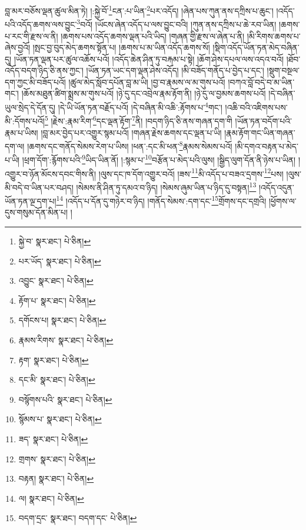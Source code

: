 བླ་མར་བཅོས་ལྡན་ཚུལ་མིན་ཏེ། །:སྐྱེ་བོ་\footnote{སྐྱེ་བ་  སྣར་ཐང་།  པེ་ཅིན། }ངན་:པ་ཡིན་\footnote{པར་ཡོད་  སྣར་ཐང་།  པེ་ཅིན། }པར་འདོད། །ཞེན་པས་ཀུན་ནས་དཀྲིས་པ་ཆུང་། །འདོད་པའི་འདོད་ཆགས་ལས་བྱུང་\footnote{འབྱུང་  སྣར་ཐང་།  པེ་ཅིན། }བའོ། །ཡོངས་ཞེན་འདོད་པ་ལས་བྱུང་བའི། །ཀུན་ནས་དཀྲིས་པ་ཆེ་རབ་ཡིན། །ཆགས་པ་རང་གི་རྫས་ལ་ནི། །ཆགས་པས་འདོད་ཆགས་ལྡན་པའི་ཡིད། །གཞན་གྱི་རྫས་ལ་ཞེན་པ་ནི། །མི་རིགས་ཆགས་པ་ཞེས་བྱའོ། །སྤང་བྱ་བུད་མེད་ཆགས་སྟོན་པ། །ཆགས་པ་མ་ཡིན་འདོད་ཆགས་སོ། །སྡིག་འདོད་ཡོན་ཏན་མེད་བཞིན་དུ། །ཡོན་ཏན་ལྡན་པར་ཚུལ་འཆོས་པའོ། །འདོད་ཆེན་ཤིན་ཏུ་བརྐམ་པ་སྟེ། །ཆོག་ཤེས་དཔལ་ལས་འདའ་བའོ། །ཐོབ་འདོད་བདག་ཉིད་ཅི་ནས་ཀྱང་། །ཡོན་ཏན་ཡང་དག་ལྡན་ཤེས་འདོད། །མི་བཟོད་གནོད་པ་བྱེད་པ་དང་། །སྡུག་བསྔལ་དག་ཀྱང་མི་བཟོད་པའོ། །ཚུལ་མེད་སློབ་དཔོན་བླ་མ་ཡི། །བྱ་བ་རྣམས་ལ་མ་གུས་པའོ། །བཀའ་བློ་བདེ་བ་མ་ཡིན་གང་། །ཆོས་མཐུན་ཚིག་སྨྲས་མ་གུས་པའོ། །ཉེ་དུ་དང་འབྲེལ་རྣམ་རྟོག་ནི། །ཉེ་དུ་ལ་བྱམས་ཆགས་པའོ། །དེ་བཞིན་ཡུལ་སྲེད་དེ་དོན་དུ། །དེ་ཡི་ཡོན་ཏན་བརྗོད་པའོ། །དེ་བཞིན་མི་འཆི་:རྟོགས་པ་\footnote{རྟོག་པ་  སྣར་ཐང་།  པེ་ཅིན། }གང་། །འཆི་བའི་འཇིགས་པས་མི་:དོགས་པའོ།\footnote{དགོངས་པ།  སྣར་ཐང་།  པེ་ཅིན། } །རྗེས་:རྣམ་རིག་\footnote{རྣམས་རིགས་  སྣར་ཐང་།  པེ་ཅིན། }དང་ལྡན་རྟོག་\footnote{རྟག་  སྣར་ཐང་།  པེ་ཅིན། }ནི། །བདག་ཉིད་ཅི་ནས་གཞན་དག་གི །ཡོན་ཏན་བདོག་པའི་རྣམ་པ་ཡིས། །བླ་མར་བྱེད་པར་འགྱུར་སྙམ་པའོ། །གཞན་རྗེས་ཆགས་དང་ལྡན་པ་ཡི། །རྣམ་རྟོག་གང་ཡིན་གཞན་དག་ལ། །ཆགས་དང་གནོད་སེམས་རེག་པ་ཡིས། །ཕན་:དང་མི་ཕན་\footnote{དང་མི་  སྣར་ཐང་།  པེ་ཅིན། }རྣམས་སེམས་པའོ། །མི་དགའ་བརྟན་པ་མེད་པ་ཡི། །ཕྲག་དོག་:རྙོགས་པའི་\footnote{བསྙོགས་པའི་  སྣར་ཐང་།  པེ་ཅིན། }ཡིད་ཡིན་ནོ། །:སྙམ་པ་\footnote{སྙོམས་པ་  སྣར་ཐང་།  པེ་ཅིན། }བརྩོན་པ་མེད་པའི་ལུས། །སྒྱིད་ལུག་དོན་ནི་ཉེས་པ་ཡིན། །འགྱུར་བ་ཉོན་མོངས་དབང་གིས་ནི། །ལུས་དང་ཁ་དོག་འགྱུར་བའོ། །ཟས་\footnote{ཟད་  སྣར་ཐང་།  པེ་ཅིན། }མི་འདོད་པ་བཟའ་དྲགས་\footnote{གྲགས་  སྣར་ཐང་།  པེ་ཅིན། }པས། །ལུས་མི་བདེ་བ་ཡིན་པར་བཤད། །སེམས་ནི་ཤིན་ཏུ་དམའ་བ་ཉིད། །སེམས་ཞུམ་ཡིན་པ་ཉིད་དུ་བསྟན།\footnote{བརྟན།  སྣར་ཐང་།  པེ་ཅིན། } །འདོད་འདུན་ཡོན་ཏན་ལྔ་དག་པ།\footnote{ལ།  སྣར་ཐང་།  པེ་ཅིན། } །འདོད་པ་དོན་དུ་གཉེར་བ་ཉིད། །གནོད་སེམས་:དག་དང་\footnote{བདག་དྲང་  སྣར་ཐང་། བདག་དང་  པེ་ཅིན། }གྲོགས་དང་དགྲའི། །ཕྱོགས་ལ་དུས་གསུམ་དོན་མིན་པ། །
